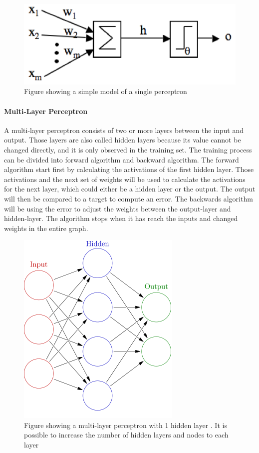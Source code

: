 \documentclass[USenglish]{ifimaster}  %
\begin{document}
	
\begin{figure}[h]
	\centering
	\includegraphics[scale=0.9]{Figures/neuron2.PNG}
	\caption{Figure showing a simple model of a single perceptron \cite{Marsland:2009:MLA:1571643}}
	\label{fig:NN}
\end{figure}
	
\paragraph{Multi-Layer Perceptron}
A multi-layer perceptron consists of two or more layers between the input and output. Those layers are also called hidden layers because its value cannot be changed directly, and it is only observed in the training set. The training process can be divided into forward algorithm and backward algorithm. The forward algorithm start first by calculating the activations of the first hidden layer. Those activations and the next set of weights will be used to calculate the activations for the next layer, which could either be a hidden layer or the output. The output will then be compared to a target to compute an error. The backwards algorithm will be using the error to adjust the weights between the output-layer and hidden-layer. The algorithm stops when it has reach the inputs and changed weights in the entire graph.
	
	
\begin{figure}[h]
	\centering
	\includegraphics[scale=0.6]{Figures/MLP.png}
	\caption{Figure showing a multi-layer perceptron with 1 hidden layer \cite{MLP}. It is possible to increase the number of hidden layers and nodes to each layer}
	\label{fig:MLP}
\end{figure}
	
\end{document}

